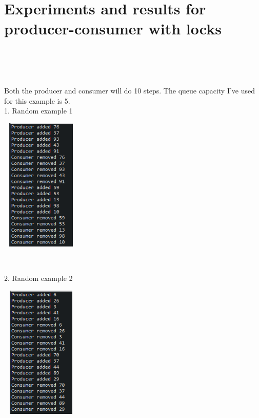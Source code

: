 \documentclass[14pt]{article}
\begin{document}
\section*{Experiments and results for producer-consumer with locks}
\\\\\\
\begin{center}
Both the producer and consumer will do 10 steps. The queue capacity I've used for this example is 5.\\
1. Random example 1\\
\vspace{10mm}

\includegraphics[height=2.5in, width = 1.5in]{pclock1.png}\\
\end{center}\\
\begin{center}
2. Random example 2\\
\vspace{10mm}

\includegraphics[height=2.5in, width = 1.5in]{pclock2.png}\\
\end{center}\\
\end{document}
